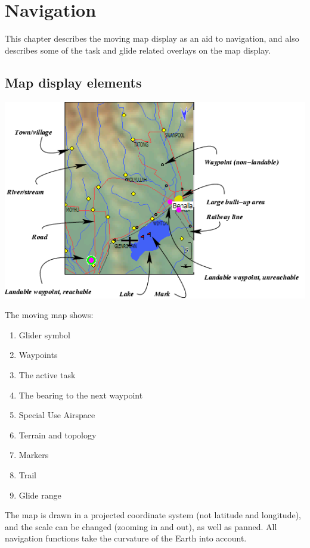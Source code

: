 \documentclass[a4paper,12pt]{refrep}
\begin{document}
\chapter{Navigation}\label{cha:navigation}
This chapter describes the moving map display as an aid to navigation,
and also describes some of the task and glide related overlays on the
map display.

\section{Map display elements}

\begin{maxipage}
\includegraphics[angle=0,width=\linewidth,keepaspectratio='true']{figures/fig-map.png}
\end{maxipage}

The moving map shows:
\begin{enumerate} 
\item Glider symbol
\item Waypoints
\item The active task
\item The bearing to the next waypoint
\item Special Use Airspace
\item Terrain and topology
\item Markers
\item Trail
\item Glide range
\end{enumerate}
The map is drawn in a projected coordinate system (not latitude and
longitude), and the scale can be changed (zooming in and out), as well
as panned.  All navigation functions take the curvature of the Earth
into account.
\end{document}
